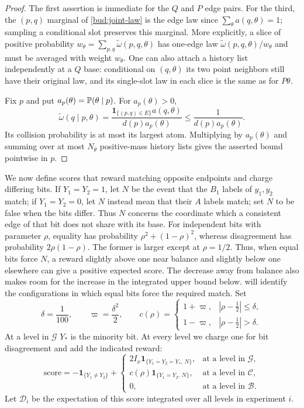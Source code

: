 \begin{proof}
The first assertion is immediate for the $Q$ and $P$ edge pairs.  For the third,
the $(p,q)$ marginal of \eqref{bud:joint-law} is the edge law since
$\sum_\theta a(q,\theta)=1$; sampling a conditional slot preserves
this marginal.  More explicitly, a slice of positive probability
$w_\theta=\sum_{p,q}\widetilde\omega(p,q,\theta)$ has one-edge law
$\widetilde\omega(p,q,\theta)/w_\theta$ and must be averaged with weight
$w_\theta$.  One can also attach a history list independently at a
$Q$ base: conditional on $(q,\theta)$ its two point neighbors still
have their original law, and its single-slot law in each slice is
the same as for $P\theta$.

Fix $p$ and put $a_p(\theta)=\mathbb P(\theta\mid p)$.  For
$a_p(\theta)>0$,
\[
 \widetilde\omega(q\mid p,\theta)
 =\frac{\mathbf1_{\{(p,q)\in E\}}a(q,\theta)}{d(p)a_p(\theta)}
 \le\frac1{d(p)a_p(\theta)}.
\]
Its collision probability is at most its largest atom.  Multiplying
by $a_p(\theta)$ and summing over at most $N_\theta$ positive-mass history lists
gives the asserted bound pointwise in $p$.
\end{proof}

We now define scores that reward matching opposite endpoints and
charge differing bits.  If $Y_1=Y_2=1$, let $N$ be the event that the
$B_1$ labels of $y_1,y_2$ match; if $Y_1=Y_2=0$, let $N$ instead
mean that their $A$ labels match; set $N$ to be false when the bits
differ.  Thus $N$ concerns the coordinate
which a consistent edge of that bit does not share with its base.
For independent bits with parameter $\rho$, equality has probability
$\rho^2+(1-\rho)^2$, whereas disagreement has probability
$2\rho(1-\rho)$. The former is larger except at $\rho=1/2$.
Thus, when equal bits force $N$, a reward slightly above one near
balance and slightly below one elsewhere can give a positive expected
score. The decrease away from balance also makes room for the
increase in the integrated upper bound below.
 will identify the configurations in which equal bits
force the required match.
Set
\[
 \delta=\frac1{100},\qquad \varpi=\frac{\delta^2}{2},\qquad
 c(\rho)=
 \begin{cases}
 1+\varpi,&|\rho-\tfrac12|\le\delta,\\
 1-\varpi,&|\rho-\tfrac12|>\delta.
 \end{cases}
\]
At a level in $\mathcal G$ $Y_\ast$ is the minority bit. At every level
we charge one for bit disagreement and add the indicated reward:
\[
 \text{score}=-\mathbf1_{\{Y_1\ne Y_2\}}+
 \begin{cases}
 2I_x\mathbf1_{\{Y_1=Y_2=Y_\ast,\,N\}},&\text{at a level in $\mathcal G$},\\
 c(\rho)\mathbf1_{\{Y_1=Y_2,\,N\}},&\text{at a level in $\mathcal C$},\\
 0,&\text{at a level in $\mathcal B$}.
 \end{cases}
\]
Let $\mathcal D_i$ be the expectation of this score integrated over all
levels in experiment $i$.

